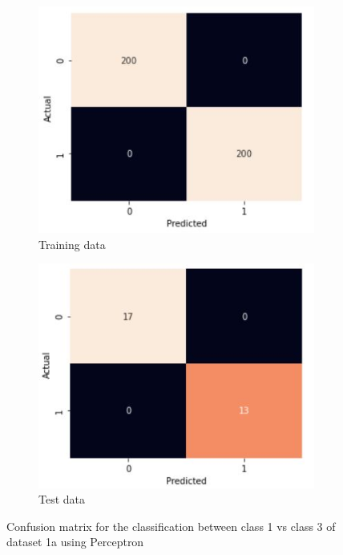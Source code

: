 \documentclass[11pt]{article}
\begin{document}
\begin{figure}
\centering
	\begin{subfigure}[b]{0.45\textwidth}
	\centering
	\includegraphics[scale=0.4]{dataset1a_perceptron_13_cm_train.jpg}
	\caption{Training data}
	\label{fig:fig1.1.5.1}
	\end{subfigure}
	\begin{subfigure}[b]{0.45\textwidth}
	\centering
	\includegraphics[scale=0.4]{dataset1a_perceptron_13_cm_test.jpg}
	\caption{Test data}
	\label{fig:fig1.1.5.2}
	\end{subfigure}
\caption{Confusion matrix for the classification between class 1 vs class 3 of dataset 1a using Perceptron}
\label{fig:fig1.1.5}
\end{figure}
\end{document}
